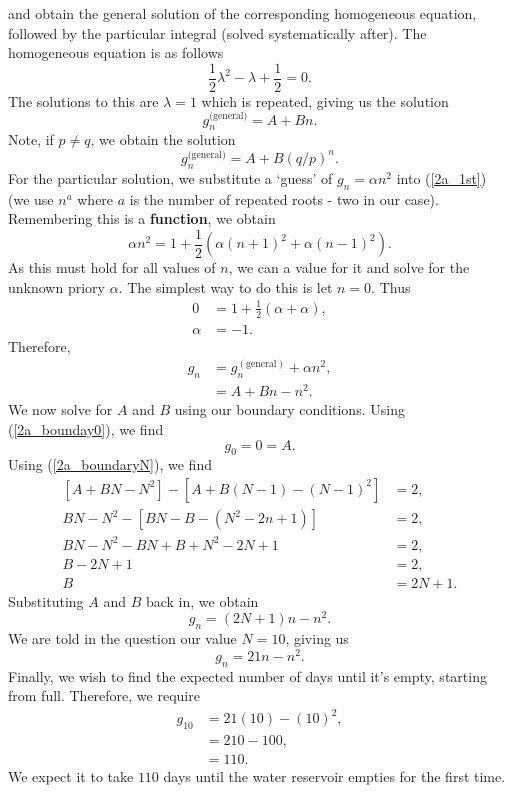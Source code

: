 \documentclass{article}
\begin{document}
and obtain the general solution of the corresponding homogeneous equation, followed by the particular integral (solved systematically after). The homogeneous equation is as follows
\begin{equation}
    \frac{1}{2}\lambda^2 - \lambda + \frac{1}{2} = 0.
\end{equation}
The solutions to this are $\lambda = 1$ which is repeated, giving us the solution
\begin{equation}
    g_n^{\text{(general)}} = A+Bn.
\end{equation}
Note, if $p\neq q$, we obtain the solution
\begin{equation}
    g_n^{\text{(general)}} = A+B(q/p)^n.    
\end{equation}
For the particular solution, we substitute a `guess' of $g_n = \alpha n^2$ into (\ref{2a_1st}) (we use $n^a$ where $a$ is the number of repeated roots - two in our case). Remembering this is a \textbf{function}, we obtain
\begin{equation}
    \alpha n^2 = 1+\frac{1}{2}( \alpha(n+1)^2 + \alpha(n-1)^2 ).
\end{equation}
As this must hold for all values of $n$, we can a value for it and solve for the unknown priory $\alpha$. The simplest way to do this is let $n = 0$. Thus
\begin{align}
    0 &= 1+\frac{1}{2}( \alpha + \alpha ),\\
    \alpha &= -1.
\end{align}
Therefore,
\begin{align}
    g_n &= g_n^{(\text{general})} + \alpha n^2,\\
    &= A+Bn -n^2.
\end{align}
We now solve for $A$ and $B$ using our boundary conditions. Using (\ref{2a_bounday0}), we find
\begin{equation}
    g_0 = 0 = A.
\end{equation}
Using (\ref{2a_boundaryN}), we find
\begin{align}
    \left[ A+BN-N^2 \right] - \left[ A+B(N-1)-(N-1)^2 \right] &= 2,\\
    BN-N^2 - [BN-B-(N^2-2n+1)] &= 2,\\
    BN-N^2-BN+B+N^2-2N+1 &=2,\\
    B-2N+1 &=2,\\
    B &= 2N+1.
\end{align}
Substituting $A$ and $B$ back in, we obtain
\begin{equation}
    g_n = (2N+1)n-n^2.
\end{equation}
We are told in the question our value $N=10$, giving us
\begin{equation}
    g_n = 21n-n^2.
\end{equation}
Finally, we wish to find the expected number of days until it's empty, starting from full. Therefore, we require
\begin{align}
    g_{10} &= 21(10)-(10)^2,\\
    &= 210 - 100,\\
    &= 110.
\end{align}
We expect it to take $110$ days until the water reservoir empties for the first time.
\end{document}
